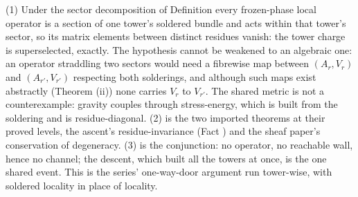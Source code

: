 (1) Under the sector decomposition of Definition  every frozen-phase local operator is a section of one tower's soldered bundle and acts within that tower's sector, so its matrix elements between distinct residues vanish: the tower charge is superselected, exactly. The hypothesis cannot be weakened to an algebraic one: an operator straddling two sectors would need a fibrewise map between $(A_{r}, V_{r})$ and $(A_{r'}, V_{r'})$ respecting both solderings, and although such maps exist abstractly (Theorem (ii)) none carries $V_{r}$ to $V_{r'}$. The shared metric is not a counterexample: gravity couples through stress-energy, which is built from the soldering and is residue-diagonal. (2) is the two imported theorems at their proved levels, the ascent's residue-invariance (Fact ) and the sheaf paper's conservation of degeneracy. (3) is the conjunction: no operator, no reachable wall, hence no channel; the descent, which built all the towers at once, is the one shared event. This is the series' one-way-door argument run tower-wise, with soldered locality in place of locality.
